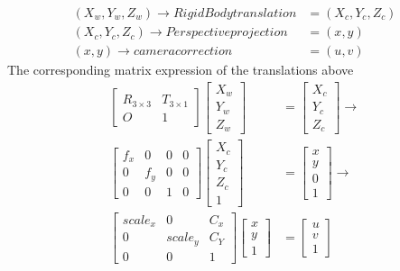 \documentclass{article}
\begin{document}
\begin{align*}
    (X_w,Y_w,Z_w)\rightarrow Rigid Body translation &= (X_c,Y_c,Z_c)
    \\(X_c,Y_c,Z_c)\rightarrow Perspective projection &= (x,y)\\(x,y)\rightarrow camera correction &= (u,v)
\end{align*}
The corresponding matrix expression of the translations above
\begin{align}
    \begin{bmatrix}
        R_{3\times3} & T_{3\times1} \\O & 1
    \end{bmatrix}\begin{bmatrix}
                     X_w \\ Y_w \\ Z_w
                 \end{bmatrix} & = \begin{bmatrix}
                                       X_c \\ Y_c \\ Z_c
                                   \end{bmatrix} \rightarrow \\\begin{bmatrix}
        f_x & 0   & 0 & 0 \\
        0   & f_y & 0 & 0 \\
        0   & 0   & 1 & 0
    \end{bmatrix}\begin{bmatrix}
        X_c \\Y_c\\Z_c\\1
    \end{bmatrix}&= \begin{bmatrix}
        x \\y\\0\\1
    \end{bmatrix} \rightarrow\\
    \begin{bmatrix}
        scale_x & 0       & C_x \\
        0       & scale_y & C_Y \\
        0       & 0       & 1
    \end{bmatrix}\begin{bmatrix}
        x\\y\\1        
    \end{bmatrix} &=\begin{bmatrix}
        u\\v\\1
    \end{bmatrix}  
\end{align}
\end{document}
